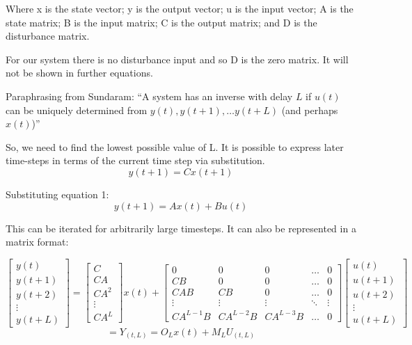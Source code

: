\documentclass{article}
\begin{document}
Where x is the state vector; y is the output vector; u is the input vector; A is the state matrix; B is the input matrix; C is the output matrix; and D is the disturbance matrix.

For our system there is no disturbance input and so D is the zero matrix. It will not be shown in further equations.

Paraphrasing from Sundaram:
“A system has an inverse with delay $L$ if $u(t)$ can be uniquely determined from $y(t),y(t+1),…y(t+L)$  (and perhaps $x(t)$)”

So, we need to find the lowest possible value of L. It is possible to express later time-steps in terms of the current time step via substitution.
\[					%
	y(t+1)=Cx(t+1)
\]

Substituting equation 1:
\[
	y(t+1)= Ax(t)+Bu(t)
\]

This can be iterated for arbitrarily large timesteps. It can also be represented in a matrix format:

\[
	\begin{bmatrix}
		y(t)   \\
		y(t+1) \\
		y(t+2) \\
		\vdots \\
		y(t+L)
	\end{bmatrix}
	=
	\begin{bmatrix}
		C   \\
		CA  \\
		CA^2\\
		\vdots\\
		CA^L
	\end{bmatrix}
	x(t) +
	\left[
	\begin{array}{c|cccc}			%
	0&0&0&\hdots&0						\\
	CB&0&0&\hdots&0						\\
	CAB&CB&0&\hdots&0					\\
	\vdots&\vdots&\vdots&\ddots&\vdots	\\
	CA^{L-1}B & CA^{L-2}B & CA^{L-3}B & \hdots & 0
	\end{array}
	\right]
	\left[
	\begin{array}{c}
		u(t)		\\
		\hline
		u(t+1)		\\
		u(t+2)		\\
		\vdots		\\
		u(t+L)
	\end{array}
	\right]
\]
\begin{equation}
=Y_{(t,L)} = O_Lx(t)+M_L U_{(t,L)}
\end{equation}
\end{document}
